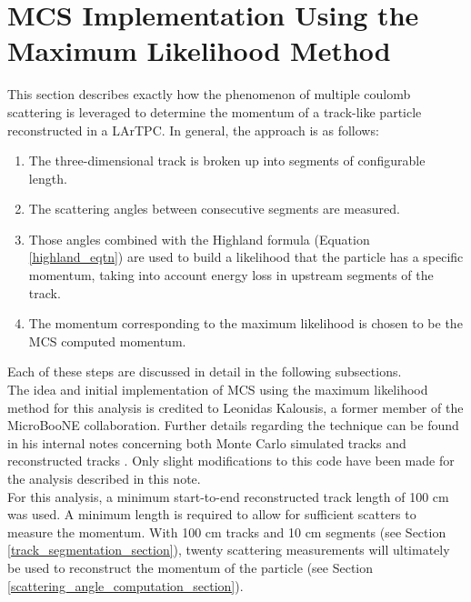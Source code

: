\section{MCS Implementation Using the Maximum Likelihood Method}\label{MCS_technique_section}

This section describes exactly how the phenomenon of multiple coulomb scattering is leveraged to determine the momentum of a track-like particle reconstructed in a LArTPC. In general, the approach is as follows:
\begin{enumerate}
\item The three-dimensional track is broken up into segments of configurable length.
\item The scattering angles between consecutive segments are measured.
\item Those angles combined with the Highland formula (Equation \ref{highland_eqtn}) are used to build a likelihood that the particle has a specific momentum, taking into account energy loss in upstream segments of the track.
\item The momentum corresponding to the maximum likelihood is chosen to be the MCS computed momentum.
\end{enumerate}
Each of these steps are discussed in detail in the following subsections.\\

The idea and initial implementation of MCS using the maximum likelihood method for this analysis is credited to Leonidas Kalousis, a former member of the MicroBooNE collaboration. Further details regarding the technique can be found in his internal notes concerning both Monte Carlo simulated tracks \cite{leonidas1} and reconstructed tracks \cite{leonidas2}. Only slight modifications to this code have been made for the analysis described in this note.\\

For this analysis, a minimum start-to-end reconstructed track length of 100 cm was used. A minimum length is required to allow for sufficient scatters to measure the momentum. With 100 cm tracks and 10 cm segments (see Section \ref{track_segmentation_section}), twenty scattering measurements will ultimately be used to reconstruct the momentum of the particle (see Section \ref{scattering_angle_computation_section}).

